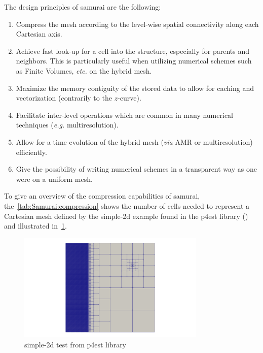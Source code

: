 The design principles of samurai are the following:
\begin{enumerate}
    \item Compress the mesh according to the level-wise spatial connectivity along each Cartesian axis.
    \item Achieve fast look-up for a cell into the structure, especially for parents and neighbors. This is particularly useful when utilizing numerical schemes such as Finite Volumes, \emph{etc.} on the hybrid mesh.
    \item Maximize the memory contiguity of the stored data to allow for caching and vectorization (contrarily to the $z$-curve).
    \item Facilitate inter-level operations which are common in many numerical techniques (\emph{e.g.} multiresolution).
    \item Allow for a time evolution of the hybrid mesh (\emph{via} AMR or multiresolution)  efficiently.
    \item Give the possibility of writing numerical schemes in a transparent way as one were on a uniform mesh.
\end{enumerate}

To give an overview of the compression capabilities of samurai, the~\cref{tab:Samurai:compression} shows the number of cells needed to represent a Cartesian mesh defined by the simple-2d example found in the p4est library (\cite{burstedde_p4est_2011}) and illustrated in~\cref{fig:Samurai:simple2d}.

\begin{figure}[h!]
    \centering
    \includegraphics[width=0.8\textwidth]{graphics/samurai/p4est_3.png}
    \caption{simple-2d test from p4est library}
    \label{fig:Samurai:simple2d}
\end{figure}

